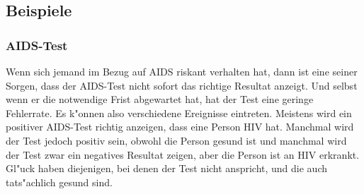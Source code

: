 \subsection{Beispiele}
\subsubsection{AIDS-Test}
Wenn sich jemand im Bezug auf AIDS riskant verhalten hat, dann ist
eine seiner Sorgen, dass der AIDS-Test nicht sofort das richtige
Resultat anzeigt.
Und selbst wenn er die notwendige Frist abgewartet
hat, hat der Test eine geringe Fehlerrate.
Es k"onnen also verschiedene Ereignisse eintreten.
Meistens wird ein
positiver AIDS-Test richtig anzeigen, dass eine Person HIV hat.
Manchmal
wird der Test jedoch positiv sein, obwohl die Person gesund ist
und manchmal wird der Test zwar ein negatives Resultat zeigen,
aber die Person ist an HIV erkrankt.
Gl"uck haben diejenigen, bei denen der Test nicht
anspricht, und die auch tats"achlich gesund sind.


